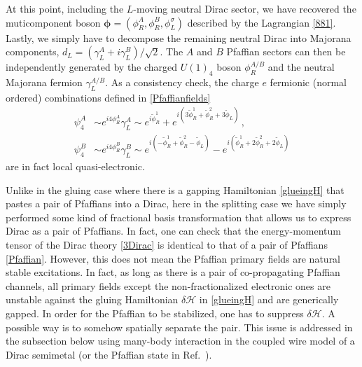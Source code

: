 At this point, including the $L$-moving neutral Dirac sector, we have recovered the muticomponent boson $\boldsymbol\phi=(\phi^A_R,\phi^B_R,\phi^\sigma_L)$ described by the Lagrangian \eqref{881}. Lastly, we simply have to decompose the remaining neutral Dirac into Majorana components, $d_L=(\gamma^A_L+i\gamma^B_L)/\sqrt{2}$. The $A$ and $B$ Pfaffian sectors can then be independently generated by the charged $U(1)_4$ boson $\phi^{A/B}_R$ and the neutral Majorana fermion $\gamma^{A/B}_L$. As a consistency check, the charge $e$ fermionic (normal ordered) combinations defined in \eqref{Pfaffianfields} \begin{align}\psi_4^A&\sim e^{i4\phi^A_R}\gamma_L^A\sim e^{i\tilde\phi^1_R}+e^{i(3\tilde\phi^1_R+\tilde\phi^2_R+3\tilde\phi_L)}\label{psi4def1} \,, \\\psi_4^B&\sim e^{i4\phi^B_R}\gamma_L^B\sim e^{i(-\tilde\phi^1_R+\tilde\phi^2_R-\tilde\phi_L)}-e^{i(\tilde\phi^1_R+2\tilde\phi^2_R+2\tilde\phi_L)}\nonumber\end{align} are in fact local quasi-electronic. %

Unlike in the gluing case where there is a gapping Hamiltonian \eqref{glueingH} that pastes a pair of Pfaffians into a Dirac, here in the splitting case we have simply performed some kind of fractional basis transformation that allows us to express Dirac as a pair of Pfaffians. In fact, one can check that the energy-momentum tensor of the Dirac theory \eqref{3Dirac} is identical to that of a pair of Pfaffians \eqref{Pfaffian}. However, this does not mean the Pfaffian primary fields are natural stable excitations. In fact, as long as there is a pair of co-propagating Pfaffian channels, all primary fields except the non-fractionalized electronic ones are unstable against the gluing Hamiltonian $\delta\mathcal{H}$ in \eqref{glueingH} and are generically gapped. In order for the Pfaffian \CFT to be stabilized, one has to suppress $\delta\mathcal{H}$. A possible way is to somehow spatially separate the pair. This issue is addressed in the subsection below using many-body interaction in the coupled wire model of a Dirac semimetal (or the \PHS Pfaffian \FQH state in Ref.~\cite{KaneSternHalperin17}).

